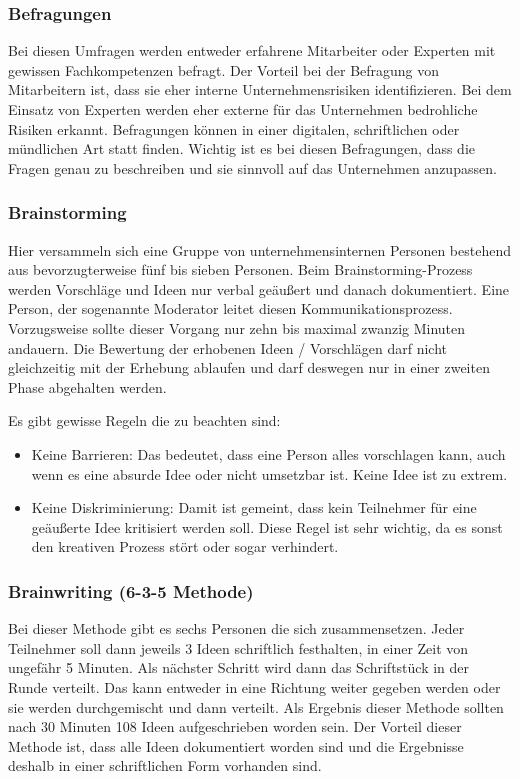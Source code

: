 \subsubsection{Befragungen}
Bei diesen Umfragen werden entweder erfahrene Mitarbeiter oder Experten mit gewissen Fachkompetenzen befragt. Der Vorteil bei der Befragung von Mitarbeitern ist, dass sie eher interne Unternehmensrisiken identifizieren. Bei dem Einsatz von Experten werden eher externe für das Unternehmen bedrohliche Risiken erkannt. Befragungen können in einer digitalen, schriftlichen oder mündlichen Art statt finden.
Wichtig ist es bei diesen Befragungen, dass die Fragen genau zu beschreiben und sie sinnvoll auf das Unternehmen anzupassen.

\subsubsection{Brainstorming}
Hier versammeln sich eine Gruppe von unternehmensinternen Personen bestehend aus bevorzugterweise fünf bis sieben Personen. 
Beim Brainstorming-Prozess werden Vorschläge und Ideen nur verbal geäußert und danach dokumentiert. Eine Person, der sogenannte Moderator leitet diesen Kommunikationsprozess. Vorzugsweise sollte dieser Vorgang nur zehn bis maximal zwanzig Minuten andauern.
Die Bewertung der erhobenen Ideen / Vorschlägen darf nicht gleichzeitig mit der Erhebung ablaufen und darf deswegen nur in einer zweiten Phase abgehalten werden.

Es gibt gewisse Regeln die zu beachten sind:
\begin{itemize}
	\item Keine Barrieren: Das bedeutet, dass eine Person alles vorschlagen kann, auch wenn es eine absurde Idee oder nicht umsetzbar ist. Keine Idee ist zu extrem.
	\item Keine Diskriminierung: Damit ist gemeint, dass kein Teilnehmer für eine geäußerte Idee kritisiert werden soll. Diese Regel ist sehr wichtig, da es sonst den kreativen Prozess stört oder sogar verhindert.
\end{itemize}

\subsubsection{Brainwriting (6-3-5 Methode)}
Bei dieser Methode gibt es sechs Personen die sich zusammensetzen. Jeder Teilnehmer soll dann jeweils 3 Ideen schriftlich festhalten, in einer Zeit von ungefähr 5 Minuten.
Als nächster Schritt wird dann das Schriftstück in der Runde verteilt. Das kann entweder in eine Richtung weiter gegeben werden oder sie werden durchgemischt und dann verteilt. 
Als Ergebnis dieser Methode sollten nach 30 Minuten 108 Ideen aufgeschrieben worden sein.
Der Vorteil dieser Methode ist, dass alle Ideen dokumentiert worden sind und die Ergebnisse deshalb in einer schriftlichen Form vorhanden sind.

